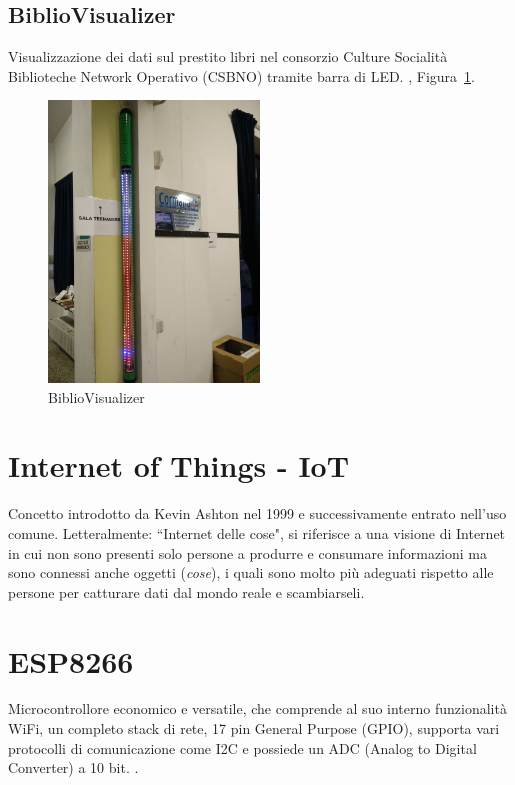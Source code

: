 \documentclass[12pt,a4paper]{report}
\begin{document}
\subsection{BiblioVisualizer}
Visualizzazione dei dati sul prestito libri nel consorzio Culture Socialità Biblioteche Network Operativo (CSBNO) tramite barra di LED.
\cite{bibliovisgitlab}, Figura~\ref{fig:bibliovisualizer}.
\begin{figure}[h]
  \centering
  \includegraphics[width=0.5\textwidth]{bibliovisualizer}
  \caption{BiblioVisualizer}
  \label{fig:bibliovisualizer}
\end{figure}

\section{Internet of Things - IoT}
Concetto introdotto da Kevin Ashton nel 1999 e successivamente entrato nell'uso comune. Letteralmente: ``Internet delle cose",
si riferisce a una visione di Internet in cui non sono presenti solo persone a produrre e consumare informazioni ma
sono connessi anche oggetti (\emph{cose}), i quali sono molto più adeguati rispetto alle persone per catturare dati dal mondo reale
e scambiarseli.
\cite{ashton2009internet}

\section{ESP8266}
Microcontrollore economico e versatile, che comprende al suo interno funzionalità WiFi, un completo stack di rete, 17 pin General
Purpose (GPIO), supporta vari protocolli di comunicazione come I2C e possiede un ADC (Analog to Digital Converter) a 10 bit.
\cite{esp8266}.
\end{document}
